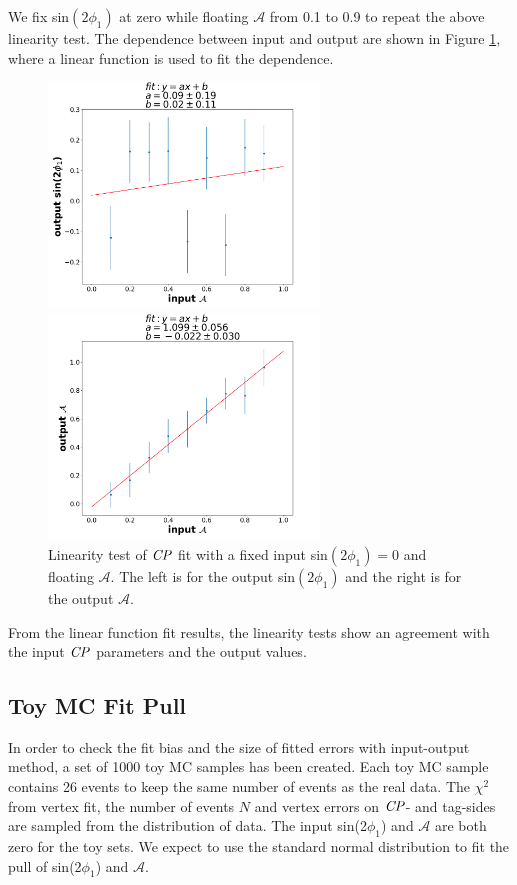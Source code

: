 We fix sin$(2\phi_1)$ at zero while floating $\mathcal{A}$ from  0.1 to 0.9 to repeat the above linearity test. The dependence between input and output are shown in Figure \ref{fig:cpfit_line_A}, where a linear function is used to fit the dependence. 
\begin{figure}[htpb]
	\begin{minipage}{0.5\linewidth}
		\includegraphics[height=6cm]{figures/S-test-line_fixS}
	\end{minipage}
	\begin{minipage}{0.5\linewidth}
		\includegraphics[height=6cm]{figures/A-test-line_fixS}
	\end{minipage}
	\caption{Linearity test of $\it{CP}$ fit with a fixed input sin$(2\phi_1)=0$ and floating $\mathcal{A}$. The left is for the output sin$(2\phi_1)$ and the right is for the output $\mathcal{A}$.}
	\label{fig:cpfit_line_A}
\end{figure}
From the linear function fit results, the linearity tests show an agreement with the input $\it{CP}$ parameters and the output values. 
\subsection{Toy MC Fit Pull}
In order to check the fit bias and the size of fitted errors with input-output method, a set of 1000 toy MC samples has been created. Each toy MC sample contains 26 events to keep the same number of events as the real data. The $\chi^2$ from vertex fit, the number of events $N$ and vertex errors on $\it{CP}$- and tag-sides are sampled from the distribution of data. The input sin(2$\phi_1$) and $\mathcal{A}$ are both zero for the toy sets. We expect to use the standard normal distribution to fit the pull of sin(2$\phi_1$) and $\mathcal{A}$. 

